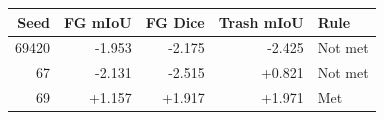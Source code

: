 \begin{tabular}{@{}rrrrl@{}}\toprule
Seed & FG mIoU & FG Dice & Trash mIoU & Rule \\ \midrule
69420 & -1.953 & -2.175 & -2.425 & Not met \\
67 & -2.131 & -2.515 & +0.821 & Not met \\
69 & +1.157 & +1.917 & +1.971 & Met \\
\bottomrule\end{tabular}

